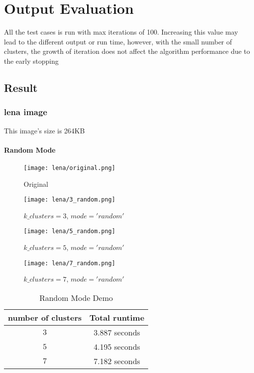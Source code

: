 \section{Output Evaluation}
All the test cases is run with max iterations of 100. Increasing this value may lead to the different output or run time, however, with the small number of clusters, the growth of iteration does not affect the algorithm performance due to the early stopping
\pagebreak
\subsection{Result}
\subsubsection{lena image}
\quad This image's size is 264KB

\paragraph{Random Mode}
\quad 
\begin{figure}[htbp]
    \centering
    \begin{minipage}{0.45\textwidth}
        \centering
        \texttt{[image: lena/original.png]}
        \caption{Original}
    \end{minipage}\hfill
    \begin{minipage}{0.45\textwidth}
        \centering
        \texttt{[image: lena/3\_random.png]}
        \caption{$k\_clusters = 3$, $mode = 'random'$}
    \end{minipage}
    
    \vspace{0.5cm} %
    
    \begin{minipage}{0.45\textwidth}
        \centering
        \texttt{[image: lena/5\_random.png]}
        \caption{$k\_clusters = 5$, $mode = 'random'$}
    \end{minipage}\hfill
    \begin{minipage}{0.45\textwidth}
        \centering
        \texttt{[image: lena/7\_random.png]}
        \caption{$k\_clusters = 7$, $mode = 'random'$}
    \end{minipage}
\end{figure}
\begin{table}[htbp]
    \centering
    \begin{tabular}{|c|c|}
        \hline
        \textbf{number of clusters} & \textbf{Total runtime} \\
        \hline
        $3$ & 3.887 seconds \\
        \hline
        $5$ & 4.195 seconds \\
        \hline
        $7$ & 7.182 seconds \\
        \hline
    \end{tabular}
    \caption{Random Mode Demo}
    \label{tab:random_mode}
\end{table}
\clearpage 
